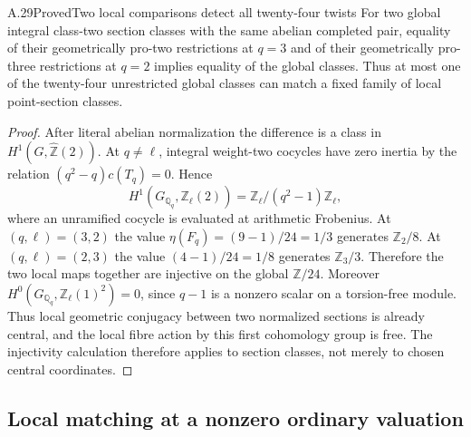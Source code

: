 \begin{result}{A.29}{Proved}{Two local comparisons detect all twenty-four twists}
\label{coh:local24}
For two global integral class-two section classes with the same
abelian completed pair, equality of their geometrically pro-two
restrictions at $q=3$ and of their geometrically pro-three
restrictions at $q=2$ implies equality of the global classes.
Thus at most one of the twenty-four unrestricted global classes can
match a fixed family of local point-section classes.
\end{result}
\begin{proof}
After literal abelian normalization the difference is a class in
$H^1(G,\widehat{\mathbb Z}(2))$. At $q\ne\ell$, integral
weight-two cocycles have zero inertia by the relation
$(q^2-q)c(T_q)=0$. Hence
\[
 H^1(G_{\mathbb Q_q},\mathbb Z_\ell(2))
           =\mathbb Z_\ell/(q^2-1)\mathbb Z_\ell,
\]
where an unramified cocycle is evaluated at arithmetic Frobenius.
At $(q,\ell)=(3,2)$ the value
$\eta(F_q)=(9-1)/24=1/3$ generates $\mathbb Z_2/8$.
At $(q,\ell)=(2,3)$ the value $(4-1)/24=1/8$ generates
$\mathbb Z_3/3$. Therefore the two local maps together are
injective on the global $\mathbb Z/24$.
Moreover $H^0(G_{\mathbb Q_q},\mathbb Z_\ell(1)^2)=0$, since
$q-1$ is a nonzero scalar on a torsion-free module. Thus local
geometric conjugacy between two normalized sections is already central,
and the local fibre action by this first cohomology group is free.
The injectivity calculation therefore applies to section classes,
not merely to chosen central coordinates.
\end{proof}

\subsection{Local matching at a nonzero ordinary valuation}

